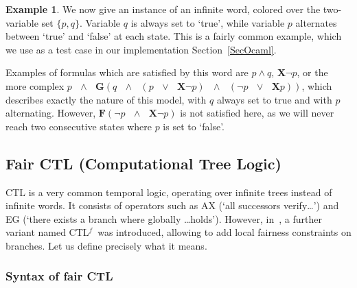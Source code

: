 \documentclass[11pt]{article}
\newcommand{\CTLf}{{CTL$^f$}}
\newcommand{\X}{{\mathbf{X}}}
\newcommand{\F}{{\mathbf{F}}}
\newcommand{\orr}{{\vee}}
\newcommand{\andd}{{\wedge}}
\newcommand{\G}{{\mathbf{G}}}
\theoremstyle{definition}
\newtheorem*{example}{Example}
\begin{document}
\begin{example}
We now give an instance of an infinite word, colored over the two-variable set $\{p,q\}$. Variable $q$ is always set to `true',
while variable $p$ alternates between `true' and `false' at each state. This is a fairly common example, which we use as a test 
case in our implementation Section~\ref*{SecOcaml}.

\begin{center} 
\end{center}

Examples of formulas which are satisfied by this word are $p\andd q$, $\X\neg p$, or the more complex 
$p\mbox{ }\andd \mbox{ }\G(q \mbox{ }\andd \mbox{ }(p \mbox{ }\orr\mbox{ } \X\neg p)\mbox{ } \andd \mbox{ }(\neg p \mbox{ }\orr\mbox{ } \X p))$, which describes exactly the nature of this model,
with $q$ always set to true and with $p$ alternating.
However, $\F(\neg p \mbox{ } \andd \mbox{ }\X\neg p)$ is not satisfied here, as we will never reach two consecutive states where 
$p$ is set to `false'.

\end{example}

\subsection{Fair CTL (Computational Tree Logic)}
CTL is a very common temporal logic, operating over infinite trees instead of infinite words.
It consists of operators such as AX (`all successors verify\ldots') and EG
(`there exists a branch where globally \ldots holds'). However, in~\cite{GhivG16}, a 
further variant named
\CTLf~was introduced, allowing to add local fairness constraints on branches. Let us define precisely
what it means.

\subsubsection*{Syntax of fair CTL}\label{subsec:syntax_CTLf}
\end{document}
